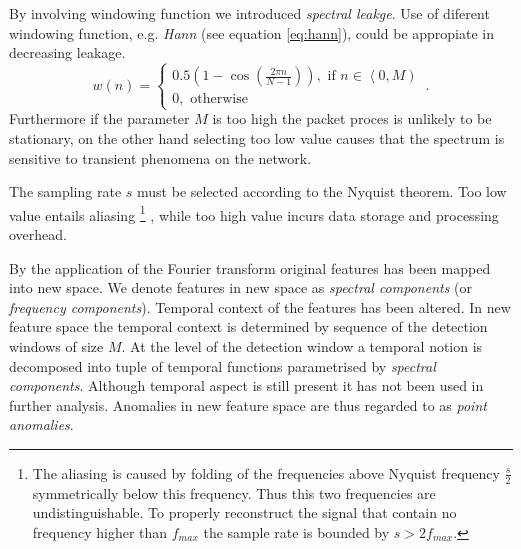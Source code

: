 By involving windowing function we introduced
\emph{spectral leakge}. Use of diferent windowing function, e.g. \emph{Hann} 
(see equation \ref{eq:hann}),
could be appropiate in decreasing leakage.
\begin{equation}\label{eq:hann}
w(n) = \left\lbrace \begin{array}{l} 
0.5\left(1 - \cos \left ( \frac{2 \pi n}{N-1} \right) \right), \mbox{ if } n\in \left\langle 
0, M \right) \\ 0, \mbox{ otherwise} \end{array}\right. \,.
\end{equation}
Furthermore if the parameter $M$ is too high the packet proces is unlikely to be stationary, 
on the other hand selecting too low value causes that the spectrum is sensitive
to transient phenomena on the network. %

The sampling rate $s$ must be selected according to the Nyquist theorem. 
Too low value entails aliasing%
\footnote{The aliasing is caused by folding of the frequencies above Nyquist frequency
$\frac{s}{2}$ symmetrically below this frequency. Thus this two frequencies are undistinguishable.
To properly reconstruct the signal that contain no frequency higher than $f_{max}$ 
the sample rate is bounded by $s > 2f_{max}$.}%
, while too high value incurs data storage and processing overhead. 

By the application of the Fourier transform original features has been mapped into new space.
We denote features in new space as \emph{spectral components} (or \emph{frequency components}).
Temporal context of the features has been altered. 
In new feature space the temporal context is determined by sequence
of the detection windows of size $M$. 
At the level of the detection window a temporal notion is decomposed 
into tuple of temporal functions parametrised by \emph{spectral components}.
Although temporal aspect is still present it has not been used in further analysis.
Anomalies in new feature space are thus regarded to as \emph{point anomalies}. %


